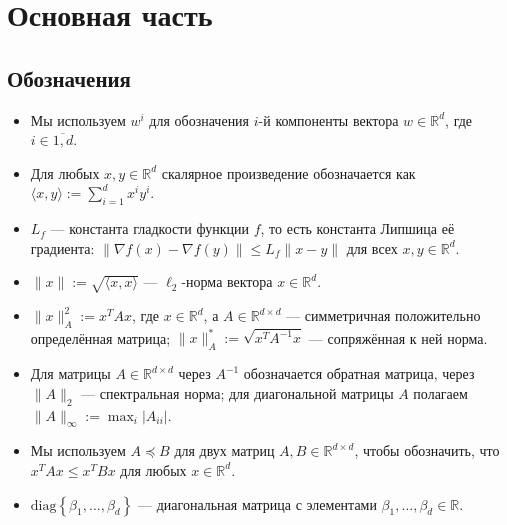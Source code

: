 \section{Основная часть}

\subsection{Обозначения}
\begin{itemize}
    \item Мы используем $w^i$ для обозначения $i$-й компоненты вектора $w \in \mathbb{R}^d$, где $i \in \overline{1, d}$.
    \item Для любых $x, y \in \mathbb{R}^d$ скалярное произведение обозначается как $\langle x, y \rangle := \sum_{i=1}^d x^i y^i$.
    \item $L_f$ --- константа гладкости функции $f$, то есть константа Липшица её градиента: $\|\nabla f(x) - \nabla f(y)\| \le L_f \|x - y\|$ для всех $x, y \in \mathbb{R}^d$.
    \item $\|x\| := \sqrt{\langle x, x \rangle}$ --- $\ell_2$-норма вектора $x \in \mathbb{R}^d$.
    \item $\|x\|_A^2 := x^T A x$, где $x \in \mathbb{R}^d$, а $A \in \mathbb{R}^{d \times d}$ --- симметричная положительно определённая матрица; $\|x\|_A^* := \sqrt{x^T A^{-1} x}$ --- сопряжённая к ней норма.
    \item Для матрицы $A \in \mathbb{R}^{d \times d}$ через $A^{-1}$ обозначается обратная матрица, через $\|A\|_2$ --- спектральная норма; для диагональной матрицы $A$ полагаем $\|A\|_\infty := \max_i |A_{ii}|$.
    \item Мы используем $A \preccurlyeq B$ для двух матриц $A, B \in \mathbb{R}^{d \times d}$, чтобы обозначить, что $x^TAx \le x^TBx$ для любых $x \in \mathbb{R}^d$.
    \item $\textrm{diag} \left\{ \beta_1, \ldots, \beta_d \right\}$ --- диагональная матрица с элементами $\beta_1, \ldots, \beta_d \in \mathbb{R}$.
\end{itemize}
